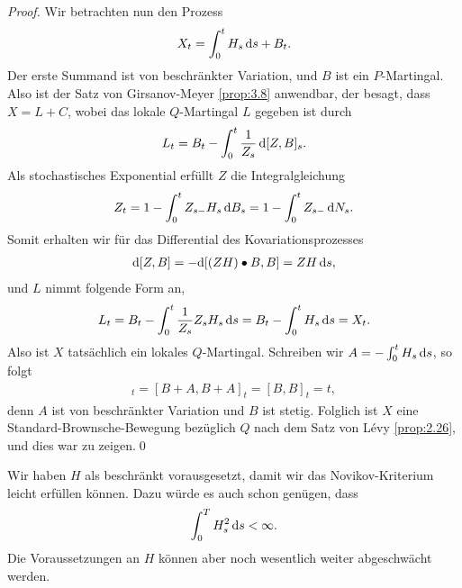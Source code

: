 \begin{proof}
Wir betrachten nun den Prozess
\begin{align*}
X_t = \int_0^t H_s\,\mathrm{d} s + B_t.
\end{align*}
Der erste Summand ist von beschränkter Variation, und $B$ ist ein $P$-Martingal.
Also ist der Satz von Girsanov-Meyer \ref{prop:3.8} anwendbar, der besagt, dass
$X = L + C$, wobei das lokale $Q$-Martingal $L$ gegeben ist durch
\begin{align*}
L_t = B_t - \int_0^t \frac{1}{Z_s}\,\mathrm{d}[Z,B]_s.
\end{align*}
Als stochastisches Exponential erfüllt $Z$ die Integralgleichung
\begin{align*}
Z_t = 1 - \int_0^t Z_{s-}H_s \,\mathrm{d} B_s =  1 - \int_0^t Z_{s-}\,\mathrm{d} N_s.
\end{align*}
Somit erhalten wir für das Differential des Kovariationsprozesses
\begin{align*}
\mathrm{d}[Z,B] = -\mathrm{d}[(ZH)\bullet B,B] = ZH\,\mathrm{d} s,
\end{align*}
und $L$ nimmt folgende Form an,
\begin{align*}
L_t = B_t - \int_0^t \frac{1}{Z_s}Z_s H_s\,\mathrm{d} s = 
B_t - \int_0^t H_s\,\mathrm{d} s = X_t.
\end{align*}
Also ist $X$ tatsächlich ein lokales $Q$-Martingal. 
Schreiben wir $A = -\int_0^t H_s\,\mathrm{d} s$, so folgt
\begin{align*}
[X,X]_t = [B+A,B+A]_t = [B,B]_t = t,
\end{align*}
denn $A$ ist von beschränkter Variation und $B$ ist stetig.
Folglich ist $X$ eine Standard-Brownsche-Bewegung bezüglich $Q$ nach dem Satz
von Lévy \ref{prop:2.26}, und dies war zu zeigen.\qed
\end{proof}

\begin{rem*}
Wir haben $H$ als beschränkt vorausgesetzt, damit wir das Novikov-Kriterium
leicht erfüllen können. Dazu würde es auch schon genügen, dass
\begin{align*}
\int_0^T H_s^2 \,\mathrm{d} s < \infty.
\end{align*}
Die Voraussetzungen an $H$ können aber noch wesentlich weiter abgeschwächt
werden.\map
\end{rem*}

